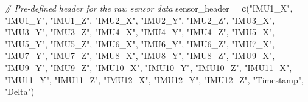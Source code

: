 \documentclass[]{article}
\newenvironment{Shaded}{\begin{snugshade}}{\end{snugshade}}
\newcommand{\CommentTok}[1]{\textcolor[rgb]{0.56,0.35,0.01}{\textit{#1}}}
\newcommand{\KeywordTok}[1]{\textcolor[rgb]{0.13,0.29,0.53}{\textbf{#1}}}
\newcommand{\NormalTok}[1]{#1}
\newcommand{\StringTok}[1]{\textcolor[rgb]{0.31,0.60,0.02}{#1}}
\begin{document}
\begin{Shaded}
\begin{Highlighting}[]
\CommentTok{# Pre-defined header for the raw sensor data}
\NormalTok{sensor_header =}\StringTok{ }\KeywordTok{c}\NormalTok{(}\StringTok{"IMU1_X"}\NormalTok{, }\StringTok{"IMU1_Y"}\NormalTok{,   }\StringTok{"IMU1_Z"}\NormalTok{,   }
                  \StringTok{"IMU2_X"}\NormalTok{, }\StringTok{"IMU2_Y"}\NormalTok{,   }\StringTok{"IMU2_Z"}\NormalTok{,}
                  \StringTok{"IMU3_X"}\NormalTok{, }\StringTok{"IMU3_Y"}\NormalTok{,   }\StringTok{"IMU3_Z"}\NormalTok{,}
                  \StringTok{"IMU4_X"}\NormalTok{, }\StringTok{"IMU4_Y"}\NormalTok{,   }\StringTok{"IMU4_Z"}\NormalTok{,}
                  \StringTok{"IMU5_X"}\NormalTok{, }\StringTok{"IMU5_Y"}\NormalTok{,   }\StringTok{"IMU5_Z"}\NormalTok{,}
                  \StringTok{"IMU6_X"}\NormalTok{, }\StringTok{"IMU6_Y"}\NormalTok{,   }\StringTok{"IMU6_Z"}\NormalTok{,}
                  \StringTok{"IMU7_X"}\NormalTok{, }\StringTok{"IMU7_Y"}\NormalTok{,   }\StringTok{"IMU7_Z"}\NormalTok{,}
                  \StringTok{"IMU8_X"}\NormalTok{, }\StringTok{"IMU8_Y"}\NormalTok{,   }\StringTok{"IMU8_Z"}\NormalTok{,}
                  \StringTok{"IMU9_X"}\NormalTok{, }\StringTok{"IMU9_Y"}\NormalTok{,   }\StringTok{"IMU9_Z"}\NormalTok{,   }
                  \StringTok{"IMU10_X"}\NormalTok{, }\StringTok{"IMU10_Y"}\NormalTok{, }\StringTok{"IMU10_Z"}\NormalTok{,}
                  \StringTok{"IMU11_X"}\NormalTok{, }\StringTok{"IMU11_Y"}\NormalTok{, }\StringTok{"IMU11_Z"}\NormalTok{,  }
                  \StringTok{"IMU12_X"}\NormalTok{, }\StringTok{"IMU12_Y"}\NormalTok{, }\StringTok{"IMU12_Z"}\NormalTok{,}
                  \StringTok{"Timestamp"}\NormalTok{, }\StringTok{"Delta"}\NormalTok{)}



\end{Highlighting}
\end{Shaded}
\end{document}
